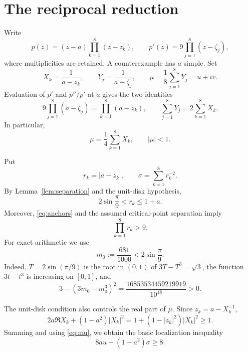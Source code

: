 \documentclass[11pt]{article}
\theoremstyle{remark}
\begin{document}
\section{The reciprocal reduction}

Write
\[
 p(z)=(z-a)\prod_{k=1}^{8}(z-z_k),
 \qquad
 p'(z)=9\prod_{j=1}^{8}(z-\zeta_j),
\]
where multiplicities are retained.  A counterexample has $a$ simple.  Set
\[
 X_k=\frac1{a-z_k},\qquad Y_j=\frac1{a-\zeta_j},\qquad
 \mu=\frac18\sum_{j=1}^{8}Y_j=u+iv.
\]
Evaluation of $p'$ and $p''/p'$ at $a$ gives the two identities
\begin{equation}\label{eq:anchors}
 9\prod_{j=1}^{8}(a-\zeta_j)=\prod_{k=1}^{8}(a-z_k),
 \qquad
 \sum_{j=1}^{8}Y_j=2\sum_{k=1}^{8}X_k.
\end{equation}
In particular,
\begin{equation}\label{eq:mu}
 \mu=\frac14\sum_{k=1}^{8}X_k,
 \qquad |\mu|<1.
\end{equation}

Put
\[
 r_k=|a-z_k|,
 \qquad
 \sigma=\sum_{k=1}^{8}r_k^{-2}.
\]
By Lemma~\ref{lem:separation} and the unit-disk hypothesis,
\begin{equation}\label{eq:annulus}
 2\sin\frac{\pi}{9}<r_k\le1+a.
\end{equation}
Moreover, \eqref{eq:anchors} and the assumed critical-point separation imply
\begin{equation}\label{eq:product}
 \prod_{k=1}^{8}r_k>9.
\end{equation}
For exact arithmetic we use
\begin{equation}\label{eq:m0}
 m_0:=\frac{681}{1000}<2\sin\frac{\pi}{9}.
\end{equation}
Indeed, $T=2\sin(\pi/9)$ is the root in $(0,1)$ of
$3T-T^3=\sqrt3$, the function $3t-t^3$ is increasing on $[0,1]$, and
\[
 3-\left(3m_0-m_0^3\right)^2
 =\frac{16853534459219919}{10^{18}}>0.
\]

The unit-disk condition also controls the real part of $\mu$.  Since
$z_k=a-X_k^{-1}$,
\[
 2a\Re X_k+(1-a^2)|X_k|^2
 =1+(1-|z_k|^2)|X_k|^2\ge1.
\]
Summing and using \eqref{eq:mu}, we obtain the basic localization inequality
\begin{equation}\label{eq:localization}
 8au+(1-a^2)\sigma\ge8.
\end{equation}
\end{document}
